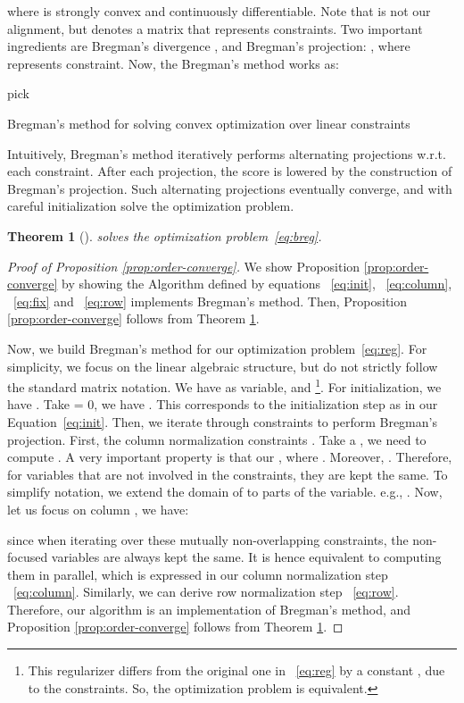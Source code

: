 \documentclass[11pt]{article}
\newtheorem{theorem}{Theorem}
\begin{document}
where  is strongly convex and continuously differentiable. Note that  is not our alignment, but denotes a matrix that represents constraints. Two important ingredients are Bregman's divergence , and Bregman's projection: , where  represents constraint. Now, the Bregman's method works as:
\begin{algorithm}[ht]
\SetAlgoLined
 pick \;
  \For{ \KwTo }{
  \;
   \For{ \KwTo }{
      \;
    }
    
  \;
 }
 \caption{Bregman's method for solving convex optimization over linear constraints}
\end{algorithm}
Intuitively, Bregman's method iteratively performs alternating projections w.r.t. each constraint. After each projection, the score  is lowered by the construction of Bregman's projection. Such alternating projections eventually converge, and with careful initialization solve the optimization problem.  
\begin{theorem}[]  \label{tm:bregman}
 solves the optimization problem~\ref{eq:breg}.
\end{theorem}
\begin{proof}[Proof of Proposition \ref{prop:order-converge}]
We show Proposition \ref{prop:order-converge} by showing the Algorithm defined by equations ~\ref{eq:init}, ~\ref{eq:column}, ~\ref{eq:fix} and  ~\ref{eq:row} implements Bregman's method. Then, Proposition \ref{prop:order-converge}  follows from Theorem \ref{tm:bregman}.

Now, we build Bregman's method for our optimization problem~\ref{eq:reg}. For simplicity, we focus on the linear algebraic structure, but do not strictly follow the standard matrix notation. We have  as variable, and \footnote{This regularizer differs from the original one in ~\ref{eq:reg} by a constant , due to the constraints. So, the optimization problem is equivalent.}. For initialization, we have . Take  = 0, we have . This corresponds to the initialization step as in our Equation~\ref{eq:init}. Then, we iterate through constraints to perform Bregman's projection. First, the column normalization constraints . Take a , we need to compute . A very important property is that our , where . Moreover, . Therefore, for variables that are not involved in the constraints, they are kept the same. To simplify notation, we extend the domain of  to parts of the variable. e.g., . Now, let us focus on column , we have:

since when iterating over these mutually non-overlapping constraints, the non-focused variables are always kept the same. It is hence equivalent to computing them in parallel, which is expressed in our column normalization step ~\ref{eq:column}. Similarly, we can derive row normalization step ~\ref{eq:row}. Therefore, our algorithm is an implementation of Bregman's method, and Proposition \ref{prop:order-converge} follows from Theorem \ref{tm:bregman}.
\end{proof}
\end{document}
